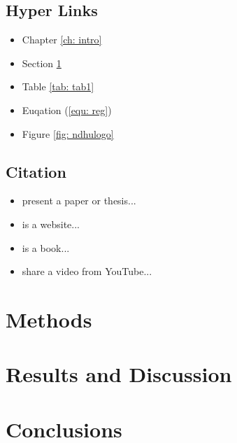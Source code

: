 \documentclass[12pt,a4paper,oneside]{book}
\begin{document}
\newpage
\section{Hyper Links}
\label{sec: link}

\begin{itemize}
    \item Chapter \ref{ch: intro}
    \item Section \ref{sec: link}
    \item Table \ref{tab: tab1}
    \item Euqation (\ref{equ: reg})
    \item Figure \ref{fig: ndhulogo}
\end{itemize}

\section{Citation}

\begin{itemize}
    \item \cite{lu2023art} present a paper or thesis...
    \item \cite{lu2023misc} is a website...
    \item \cite{lu2023book} is a book...
    \item \cite{lu2023online} share a video from YouTube...
\end{itemize}

\chapter{Methods}

\chapter{Results and Discussion}

\chapter{Conclusions}

\newpage

\printbibliography[title={References}, heading=bibintoc]

\newpage

\appendix 
\chapter{}
\end{document}
